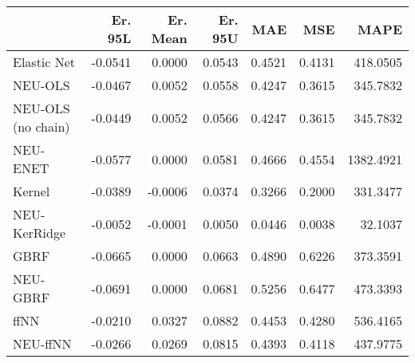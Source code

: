 \begin{tabular}{lrrrrrr}
\toprule
{} &  Er. 95L &  Er. Mean &  Er. 95U &    MAE &    MSE &      MAPE \\
\midrule
Elastic Net        &  -0.0541 &    0.0000 &   0.0543 & 0.4521 & 0.4131 &  418.0505 \\
NEU-OLS            &  -0.0467 &    0.0052 &   0.0558 & 0.4247 & 0.3615 &  345.7832 \\
NEU-OLS (no chain) &  -0.0449 &    0.0052 &   0.0566 & 0.4247 & 0.3615 &  345.7832 \\
NEU-ENET           &  -0.0577 &    0.0000 &   0.0581 & 0.4666 & 0.4554 & 1382.4921 \\
Kernel             &  -0.0389 &   -0.0006 &   0.0374 & 0.3266 & 0.2000 &  331.3477 \\
NEU-KerRidge       &  -0.0052 &   -0.0001 &   0.0050 & 0.0446 & 0.0038 &   32.1037 \\
GBRF               &  -0.0665 &    0.0000 &   0.0663 & 0.4890 & 0.6226 &  373.3591 \\
NEU-GBRF           &  -0.0691 &    0.0000 &   0.0681 & 0.5256 & 0.6477 &  473.3393 \\
ffNN               &  -0.0210 &    0.0327 &   0.0882 & 0.4453 & 0.4280 &  536.4165 \\
NEU-ffNN           &  -0.0266 &    0.0269 &   0.0815 & 0.4393 & 0.4118 &  437.9775 \\
\bottomrule
\end{tabular}
